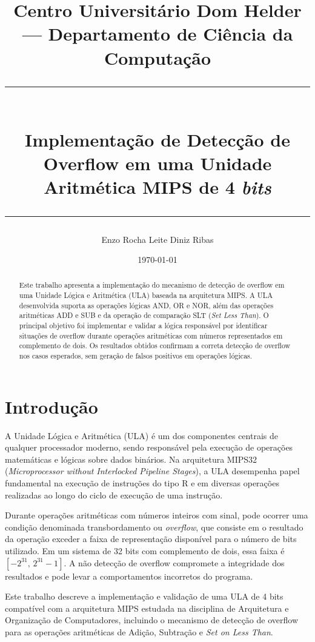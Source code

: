\documentclass[a4paper,12pt]{article}
\title{
    \large Centro Universitário Dom Helder --- Departamento de Ciência da Computação \\[0.4cm]
    \rule{\linewidth}{0.5pt} \\[0.3cm]
    \textbf{Implementação de Detecção de Overflow em uma Unidade Aritmética MIPS de 4 \textit{bits}} \\[0.2cm]
    \rule{\linewidth}{0.5pt}
}
\author{Enzo Rocha Leite Diniz Ribas}
\date{\today}
\begin{document}
\maketitle

\begin{abstract}
Este trabalho apresenta a implementação do mecanismo de detecção de overflow em uma
Unidade Lógica e Aritmética (ULA) baseada na arquitetura MIPS. A ULA desenvolvida
suporta as operações lógicas AND, OR e NOR, além das operações aritméticas ADD e SUB
e da operação de comparação SLT (\textit{Set Less Than}). O principal objetivo foi
implementar e validar a lógica responsável por identificar situações de overflow
durante operações aritméticas com números representados em complemento de dois. Os
resultados obtidos confirmam a correta detecção de overflow nos casos esperados,
sem geração de falsos positivos em operações lógicas.
\end{abstract}

\newpage
\tableofcontents
\newpage

\section{Introdução}

A Unidade Lógica e Aritmética (ULA) é um dos componentes centrais de qualquer
processador moderno, sendo responsável pela execução de operações matemáticas e
lógicas sobre dados binários. Na arquitetura MIPS32 (\textit{Microprocessor without
Interlocked Pipeline Stages}), a ULA desempenha papel fundamental na execução de
instruções do tipo R e em diversas operações realizadas ao longo do ciclo de
execução de uma instrução.

Durante operações aritméticas com números inteiros com sinal, pode ocorrer uma
condição denominada transbordamento ou \textit{overflow}, que consiste em o resultado da operação exceder a faixa de
representação disponível para o número de bits utilizado. Em um sistema de 32 bits
com complemento de dois, essa faixa é $[-2^{31},\, 2^{31}-1]$. A não detecção de overflow compromete a integridade
dos resultados e pode levar a comportamentos incorretos do programa.

Este trabalho descreve a implementação e validação de uma ULA de 4 bits compatível
com a arquitetura MIPS estudada na disciplina de Arquitetura e Organização de Computadores, incluindo o mecanismo de detecção de overflow para as
operações aritméticas de Adição, Subtração e \textit{Set on Less Than}.
\end{document}
